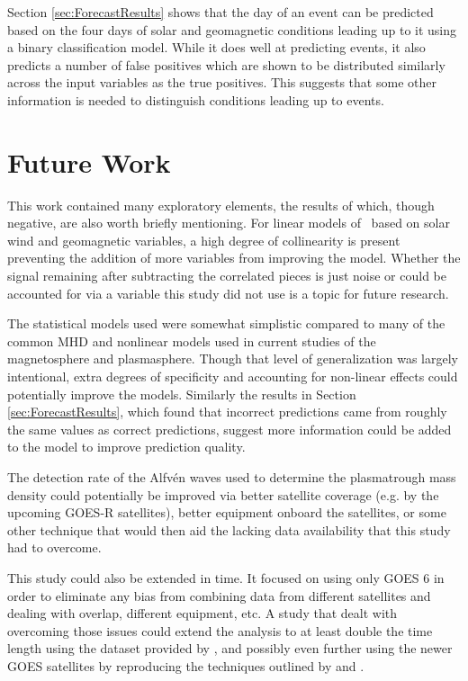 Section \ref{sec:ForecastResults} shows that the day of an event can be predicted based on the four days of solar and geomagnetic conditions leading up to it using a binary classification model. While it does well at predicting events, it also predicts a number of false positives which are shown to be distributed similarly across the input variables as the true positives.  This suggests that some other information is needed to distinguish conditions leading up to events.



\section{Future Work}

This work contained many exploratory elements, the results of which, though negative, are also worth briefly mentioning. For linear models of \req\ based on solar wind and geomagnetic variables, a high degree of collinearity is present preventing the addition of more variables from improving the model. Whether the signal remaining after subtracting the correlated pieces is just noise or could be accounted for via a variable this study did not use is a topic for future research.

The statistical models used were somewhat simplistic compared to many of the common MHD and nonlinear models used in current studies of the magnetosphere and plasmasphere.  Though that level of generalization was largely intentional, extra degrees of specificity and accounting for non-linear effects could potentially improve the models. Similarly the results in Section \ref{sec:ForecastResults}, which found that incorrect predictions came from roughly the same values as correct predictions, suggest more information could be added to the model to improve prediction quality.

The detection rate of the Alfvén waves used to determine the plasmatrough mass density could potentially be improved via better satellite coverage (e.g. by the upcoming GOES-R satellites), better equipment onboard the satellites, or some other technique that would then aid the lacking data availability that this study had to overcome. 

This study could also be extended in time. It focused on using only GOES 6 in order to eliminate any bias from combining data from different satellites and dealing with overlap, different equipment, etc. A study that dealt with overcoming those issues could extend the analysis to at least double the time length using the dataset provided by \cite{Denton}, and possibly even further using the newer GOES satellites by reproducing the techniques outlined by \cite{Takahashi2006MassDensityInferred} and \cite{Kondrashov2014ReconstructionOfGaps}. 